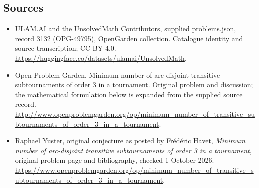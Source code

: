 \documentclass[11pt,a4paper]{article}
\begin{document}
\subsection{Sources}
\begin{itemize}
\item[S1] ULAM.AI and the UnsolvedMath Contributors, supplied problems.json, record 3132 (OPG-49795), OpenGarden collection. Catalogue identity and source transcription; CC BY 4.0.
\url{https://huggingface.co/datasets/ulamai/UnsolvedMath}.
\item[S2] Open Problem Garden, Minimum number of arc-disjoint transitive subtournaments of order 3 in a tournament. Original problem and discussion; the mathematical formulation below is expanded from the supplied source record.
\url{http://www.openproblemgarden.org/op/minimum_number_of_transitive_subtournaments_of_order_3_in_a_tournament}.

\item[R1] Raphael Yuster, original conjecture as posted by Fr\'ed\'eric
Havet, \emph{Minimum number of arc-disjoint transitive subtournaments
of order 3 in a tournament}, original problem page and bibliography,
checked 1 October 2026.
\url{https://www.openproblemgarden.org/op/minimum_number_of_transitive_subtournaments_of_order_3_in_a_tournament}.

\end{itemize}
\end{document}
